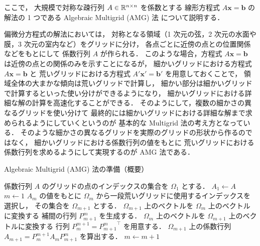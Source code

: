 
ここで，
大規模で対称な疎行列 $A \in \mathbb{R}^{n \times n}$ を係数とする
線形方程式 $A \bm{x} = \bm{b}$ の解法の 1 つである
Algebraic Multigrid (AMG) 法
\cite{Ruge1987}
について説明する．

偏微分方程式の解法においては，
対称となる領域（1 次元の弦，2 次元の水面や膜，3 次元の室内など）をグリッドに分け，
各点ごとに近傍の点との位置関係などをもとにして
係数行列 $A$ が作られる．
このような場合，方程式 $A \bm{x} = \bm{b}$ は近傍の点との関係のみを示すことになるが，
細かいグリッドにおける方程式 $A \bm{x} = \bm{b}$ と
荒いグリッドにおける方程式 $A' \bm{x}' = \bm{b}'$ を用意しておくことで，
領域全体の大まかな傾向は荒いグリッドで計算し，
細かい部分は細かいグリッドで計算するといった使い分けができるようになり，
細かいグリッドにおける詳細な解の計算を高速化することができる．
そのようにして，複数の細かさの異なるグリッドを使い分けて
最終的には細かいグリッドにおける詳細な解まで求められるようにしていくというのが
基本的な Multigrid 法の考え方となっている．
そのような細かさの異なるグリッドを実際のグリッドの形状から作るのではなく，
細かいグリッドにおける係数行列の値をもとに
荒いグリッドにおける係数行列を求めるようにして実現するのが
AMG 法である．

\begin{algorithm}[tp]
    \caption{Algebraic Multigrid (AMG) 法の準備（概要） \cite{Ruge1987,Wolters2002}}
    \label{alg:matrix-computation_amg_setup}
    \begin{algorithmic}
        \State 係数行列 $A$ のグリッドの点のインデックスの集合を $\Omega_1$ とする．
        \State $A_1 \gets A$
        \State $m \gets 1$
        \Loop
        \State $A_m$ の値をもとに $\Omega_m$ から一段荒いグリッドに使用するインデックスを選択し，
        その集合を $\Omega_{m+1}$ とする．
        \State $\Omega_{m+1}$ 上のベクトルを $\Omega_{m}$ 上のベクトルに変換する
        補間の行列 $P_{m+1}^{m}$ を生成する．
        \State $\Omega_{m}$ 上のベクトルを $\Omega_{m+1}$ 上のベクトルに変換する
        行列 $P_{m}^{m+1} = {P_{m+1}^{m}}^\top$ を用意する．
        \State $\Omega_{m+1}$ 上の係数行列 $A_{m+1} = P_{m}^{m+1} A_{m} P_{m+1}^{m}$ を算出する．
        \State \Return
        \EndIf
        \State $m \gets m + 1$
        \EndLoop
        \EndProcedure
    \end{algorithmic}
\end{algorithm}

